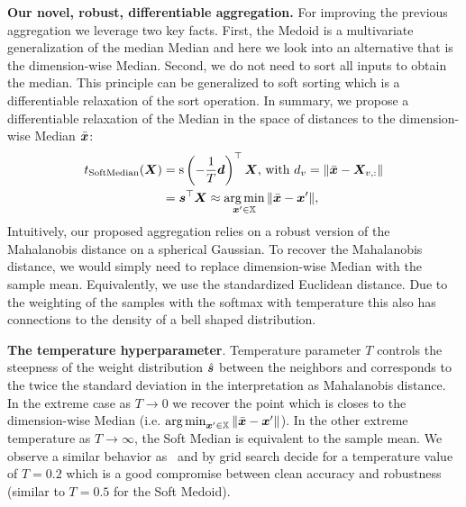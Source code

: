 \documentclass[sigconf,authordraft]{acmart}
\newcommand{\features}{\mX}
\newcommand{\featset}{\sX}
\newcommand{\softout}{\vs}
\begin{document}
\textbf{Our novel, robust, differentiable aggregation.} For improving the previous aggregation we leverage two key facts. First, the Medoid is a multivariate generalization of the median Median and here we look into an alternative that is the dimension-wise Median. Second, we do not need to sort all inputs to obtain the median. This principle can be generalized to soft sorting which is a differentiable relaxation of the sort operation. In summary, we propose a differentiable relaxation of the Median in the space of distances to the dimension-wise Median \(\bar{{\bm{x}}}\):
\begin{equation}\label{eq:softmedian}
  \begin{aligned}
  t_{\text{SoftMedian}}(\features)
  &= \text{s}\left(-\frac{1}{T} \vd \right)^\top \features \text{,~with}~\evd_{v} = \|\bar{\vx} - \features_{v,:}\| \\
  &= \softout^\top\features \approx \argmin_{\vx' \in \featset} \| \bar{\vx} - \vx' \|,
  \end{aligned}
\end{equation}
Intuitively, our proposed aggregation relies on a robust version of the Mahalanobis distance on a spherical Gaussian. To recover the Mahalanobis distance, we would simply need to replace dimension-wise Median with the sample mean. Equivalently, we use the standardized Euclidean distance. Due to the weighting of the samples with the softmax with temperature this also has connections to the density of a bell shaped distribution.

\textbf{The temperature hyperparameter}. Temperature parameter $T$ controls the steepness of the weight distribution $\hat{\softout}$ between the neighbors and corresponds to the twice the standard deviation in the interpretation as Mahalanobis distance. In the extreme case as $T \to 0$ we recover the point which is closes to the dimension-wise Median (i.e. \(\argmin_{\vx' \in \featset} \| \bar{\vx} - \vx' \|\)). In the other extreme temperature as $T\to\infty$, the Soft Median is equivalent to the sample mean. We observe a similar behavior as~\citet{Geisler2020} and by grid search decide for a temperature value of \(T=0.2\) which is a good compromise between clean accuracy and robustness (similar to \(T=0.5\) for the Soft Medoid).
\end{document}
